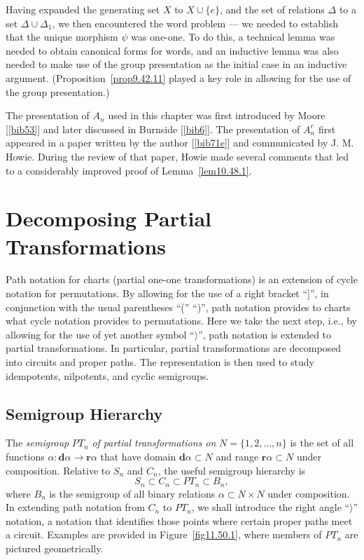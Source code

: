 \documentclass{surv-l}
\numberwithin{equation}{section}
\numberwithin{table}{section}
\numberwithin{figure}{section}
\theoremstyle{plain}
\theoremstyle{definition}
\begin{document}
Having expanded the generating set $X$ to $X\cup\{e\}$, and the
set of relations $\Delta$ to a set
$\Delta\cup\Delta_{1}$, we then encountered the word problem
--- we needed to establish that the unique morphism $\psi$ was
one-one. To do this, a technical lemma was needed to obtain
canonical forms for words, and an inductive lemma was also needed
to make use of the group presentation as the initial case in an
inductive argument. (Proposition~\ref{prop9.42.11} played a key
role in allowing for the use of the group presentation.)

The presentation of $A_{n}$ used in this chapter was first
introduced by Moore [\ref{bib53}] and later
discussed in Burnside [\ref{bib6}]. The
presentation of $A_{n}^{c}$ first appeared in a paper written by
the author [\ref{bib71e}] and communicated by J.
M. Howie. During the review of that paper,
Howie made several comments that led to a considerably improved
proof of Lemma~\ref{lem10.48.1}.

\chapter{Decomposing Partial Transformations}\label{chap11}

Path notation for charts (partial one-one transformations) is an
extension of cycle notation for permutations. By allowing for the
use of a right bracket ``]'', in conjunction with the usual
parentheses ``('' ``)'', path notation provides to charts what
cycle notation provides to permutations. Here we take the next
step, i.e., by allowing for the use of yet another symbol
``$\rangle$'', path notation is extended to partial
transformations. In particular, partial transformations are
decomposed into circuits and proper paths. The representation is
then used to study idempotents, nilpotents, and cyclic semigroups.

\setcounter{section}{49}

\section{Semigroup Hierarchy}\label{sec11.50}

The \emph{semigroup} $PT_{n}$ \emph{of partial transformations on}
$N=\{1,2,\ldots, n\}$ is the set of all functions $\alpha :
\mathbf{d}\alpha\rightarrow \mathbf{r}\alpha$ that have domain
$\mathbf{d}\alpha\subset N$ and range $\mathbf{r}\alpha\subset N$
under composition. Relative to $S_{n}$ and $C_{n}$, the useful
semigroup hierarchy is
\[
S_{n}\subset C_{n}\subset PT_{n}\subset B_{n},
\]
where $B_{n}$ is the semigroup of all binary relations
$\alpha\subset N\times N$ under composition. In extending path
notation from $C_{n}$ to $PT_{n}$, we shall introduce the right
angle ``$\rangle$'' notation, a notation that identifies those
points where certain proper paths meet a circuit. Examples are
provided in Figure~\ref{fig11.50.1}, where members of $PT_{n}$ are
pictured geometrically.
\end{document}
